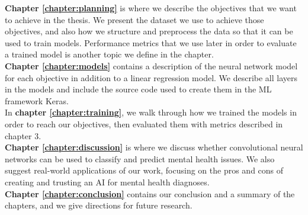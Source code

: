 \noindent \textbf{Chapter \ref{chapter:planning}} is where we describe the objectives that we want to achieve in the thesis. We present the dataset we use to achieve those objectives, and also how we structure and preprocess the data so that it can be used to train models. Performance metrics that we use later in order to evaluate a trained model is another topic we define in the chapter.\\

\noindent \textbf{Chapter \ref{chapter:models}} contains a description of the neural network model for each objective in addition to a linear regression model. We describe all layers in the models and include the source code used to create them in the ML framework Keras. \\

\noindent In \textbf{chapter \ref{chapter:training}}, we walk through how we trained the models in order to reach our objectives, then evaluated them with metrics described in chapter 3. \\

\noindent \textbf{Chapter \ref{chapter:discussion}} is where we discuss whether convolutional neural networks can be used to classify and predict mental health issues. We also suggest real-world applications of our work, focusing on the pros and cons of creating and trusting an AI for mental health diagnoses. \\

\noindent \textbf{Chapter \ref{chapter:conclusion}} contains our conclusion and a summary of the chapters, and we give directions for future research.
